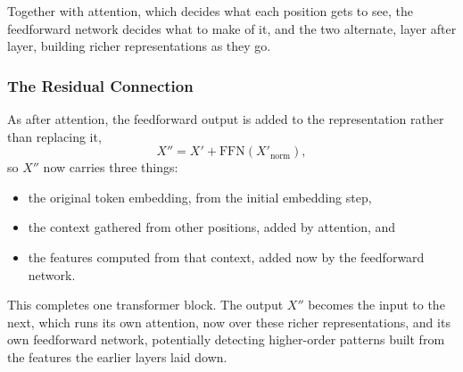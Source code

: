 \documentclass[11pt]{article}
\begin{document}


Together with attention, which decides what each position gets to see, the feedforward network decides what to make of it, and the two alternate, layer after layer, building richer representations as they go.

\subsubsection*{The Residual Connection}

As after attention, the feedforward output is added to the representation rather than replacing it,
\[
X'' = X' + \text{FFN}(X'_{\text{norm}}),
\]
so $X''$ now carries three things:
\begin{itemize}
    \item the original token embedding, from the initial embedding step,
    \item the context gathered from other positions, added by attention, and
    \item the features computed from that context, added now by the feedforward network.
\end{itemize}
This completes one transformer block. The output $X''$ becomes the input to the next, which runs its own attention, now over these richer representations, and its own feedforward network, potentially detecting higher-order patterns built from the features the earlier layers laid down.
\end{document}
